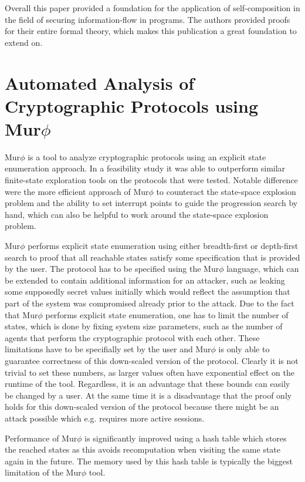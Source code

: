 \documentclass[a4paper,UKenglish]{lipics-v2018}
\def\murphi{Mur$\phi$ }
\begin{document}
Overall this paper provided a foundation for the application of self-composition in the field of securing information-flow in programs. The authors provided proofs for their entire formal theory, which makes this publication a great foundation to extend on.




\section{Automated Analysis of Cryptographic Protocols using \murphi}

\murphi is a tool to analyze cryptographic protocols using an explicit state enumeration approach. In a feasibility study it was able to outperform similar finite-state exploration tools on the protocols that were tested. Notable difference were the more efficient approach of \murphi to counteract the state-space explosion problem and the ability to set interrupt points to guide the progression search by hand, which can also be helpful to work around the state-space explosion problem.\cite{murphi}

\murphi performs explicit state enumeration using either breadth-first or depth-first search to proof that all reachable states satisfy some specification that is provided by the user. The protocol has to be specified using the \murphi language, which can be extended to contain additional information for an attacker, such as leaking some supposedly secret values initially which would reflect the assumption that part of the system was compromised already prior to the attack. Due to the fact that \murphi performs explicit state enumeration, one has to limit the number of states, which is done by fixing system size parameters, such as the number of agents that perform the cryptographic protocol with each other. These limitations have to be specifially set by the user and \murphi is only able to guarantee correctness of this down-scaled version of the protocol. Clearly it is not trivial to set these numbers, as larger values often have exponential effect on the runtime of the tool.\cite{murphi} Regardless, it is an advantage that these bounds can easily be changed by a user. At the same time it is a disadvantage that the proof only holds for this down-scaled version of the protocol because there might be an attack possible which e.g. requires more active sessions.

Performance of \murphi is significantly improved using a hash table which stores the reached states as this avoids recomputation when visiting the same state again in the future. The memory used by this hash table is typically the biggest limitation of the \murphi tool.\cite{murphi}
\end{document}
